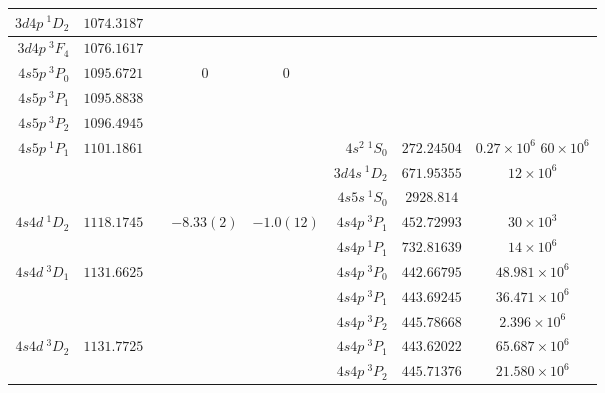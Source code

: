 \documentclass[aps,prx,10pt]{revtex4-2}
\begin{document}
\begin{longtable}{|r|c|c|c|c|r|c|c|}
\hline
$3d4p\ {}^{\mathrm{1}}\!D_2$&$1074.3187$&&&&&&\\
\hline
$3d4p\ {}^{\mathrm{3}}\!F_4$&$1076.1617$&&&&&&\\
\hline
$4s5p\ {}^{\mathrm{3}}\!P_0$&$1095.6721$&&$0$&$0$&&&\\
\hline
$4s5p\ {}^{\mathrm{3}}\!P_1$&$1095.8838$&&&&&&\\
\hline
$4s5p\ {}^{\mathrm{3}}\!P_2$&$1096.4945$&&&&&&\\
\hline
\multirow{3}{*}{$4s5p\ {}^{\mathrm{1}}\!P_1$}&\multirow{3}{*}{$1101.1861$}&\multirow{3}{*}{}&\multirow{3}{*}{}&\multirow{3}{*}{}&$4s^2\ {}^{\mathrm{1}}\!S_0$&$272.24504$&\shortstack{$0.27\times10^6$\cite{zhouMagicPhys.Rev.A2010}\\$60\times10^6$\cite{vogtCreation2009}}\\
\cline{6-8}
&&&&&$3d4s\ {}^{\mathrm{1}}\!D_2$&$671.95355$&$12\times10^6$\cite{vogtCreation2009}\\
\cline{6-8}
&&&&&$4s5s\ {}^{\mathrm{1}}\!S_0$&$2928.814$&\\
\hline
\multirow{2}{*}{$4s4d\ {}^{\mathrm{1}}\!D_2$}&\multirow{2}{*}{$1118.1745$}&\multirow{2}{*}{}&\multirow{2}{*}{$-8.33(2)$\cite{nortershauserIsotopeSpectrochimicaActaPartB:AtomicSpectroscopy1998}}&\multirow{2}{*}{$-1.0(12)$\cite{nortershauserIsotopeSpectrochimicaActaPartB:AtomicSpectroscopy1998}}&$4s4p\ {}^{\mathrm{3}}\!P_1$&$452.72993$&$30\times10^3$\cite{vogtCreation2009}\\
\cline{6-8}
&&&&&$4s4p\ {}^{\mathrm{1}}\!P_1$&$732.81639$&$14\times10^6$\cite{vogtCreation2009}\\
\hline
\multirow{3}{*}{$4s4d\ {}^{\mathrm{3}}\!D_1$}&\multirow{3}{*}{$1131.6625$}&\multirow{3}{*}{}&\multirow{3}{*}{}&\multirow{3}{*}{}&$4s4p\ {}^{\mathrm{3}}\!P_0$&$442.66795$&$48.981\times10^{6}$\cite{zhouMagicPhys.Rev.A2010}\\
\cline{6-8}
&&&&&$4s4p\ {}^{\mathrm{3}}\!P_1$&$443.69245$&$36.471\times10^{6}$\cite{zhouMagicPhys.Rev.A2010}\\
\cline{6-8}
&&&&&$4s4p\ {}^{\mathrm{3}}\!P_2$&$445.78668$&$2.396\times10^{6}$\cite{zhouMagicPhys.Rev.A2010}\\
\hline
\multirow{2}{*}{$4s4d\ {}^{\mathrm{3}}\!D_2$}&\multirow{2}{*}{$1131.7725$}&\multirow{2}{*}{}&\multirow{2}{*}{}&\multirow{2}{*}{}&$4s4p\ {}^{\mathrm{3}}\!P_1$&$443.62022$&$65.687\times10^{6}$\cite{zhouMagicPhys.Rev.A2010}\\
\cline{6-8}
&&&&&$4s4p\ {}^{\mathrm{3}}\!P_2$&$445.71376$&$21.580\times10^{6}$\cite{zhouMagicPhys.Rev.A2010}\\

\end{longtable}
\end{document}
